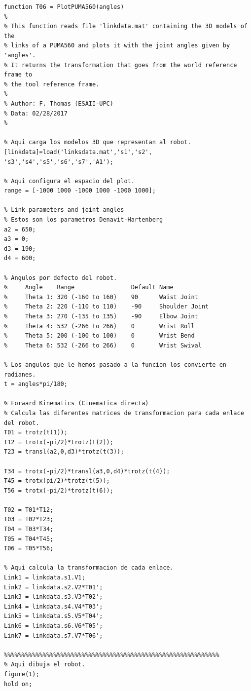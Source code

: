 \documentclass{article}
\begin{document}
\begin{lstlisting}[frame=single]
function T06 = PlotPUMA560(angles)
%
% This function reads file 'linkdata.mat' containing the 3D models of the
% links of a PUMA560 and plots it with the joint angles given by 'angles'. 
% It returns the transformation that goes from the world reference frame to
% the tool reference frame.
%
% Author: F. Thomas (ESAII-UPC)
% Data: 02/28/2017
%
 
% Aqui carga los modelos 3D que representan al robot.
[linkdata]=load('linksdata.mat','s1','s2', 's3','s4','s5','s6','s7','A1');

% Aqui configura el espacio del plot.
range = [-1000 1000 -1000 1000 -1000 1000];

% Link parameters and joint angles
% Estos son los parametros Denavit-Hartenberg
a2 = 650;
a3 = 0;
d3 = 190;
d4 = 600;

% Angulos por defecto del robot.
%     Angle    Range                Default Name
%     Theta 1: 320 (-160 to 160)    90      Waist Joint
%     Theta 2: 220 (-110 to 110)    -90     Shoulder Joint
%     Theta 3: 270 (-135 to 135)    -90     Elbow Joint
%     Theta 4: 532 (-266 to 266)    0       Wrist Roll
%     Theta 5: 200 (-100 to 100)    0       Wrist Bend
%     Theta 6: 532 (-266 to 266)    0       Wrist Swival

% Los angulos que le hemos pasado a la funcion los convierte en radianes.
t = angles*pi/180; 

% Forward Kinematics (Cinematica directa)
% Calcula las diferentes matrices de transformacion para cada enlace del robot.
T01 = trotz(t(1));
T12 = trotx(-pi/2)*trotz(t(2));
T23 = transl(a2,0,d3)*trotz(t(3));

T34 = trotx(-pi/2)*transl(a3,0,d4)*trotz(t(4));
T45 = trotx(pi/2)*trotz(t(5));
T56 = trotx(-pi/2)*trotz(t(6));

T02 = T01*T12;
T03 = T02*T23;
T04 = T03*T34;
T05 = T04*T45;
T06 = T05*T56;

% Aqui calcula la transformacion de cada enlace.
Link1 = linkdata.s1.V1;
Link2 = linkdata.s2.V2*T01';
Link3 = linkdata.s3.V3*T02';
Link4 = linkdata.s4.V4*T03';
Link5 = linkdata.s5.V5*T04';
Link6 = linkdata.s6.V6*T05';
Link7 = linkdata.s7.V7*T06';

%%%%%%%%%%%%%%%%%%%%%%%%%%%%%%%%%%%%%%%%%%%%%%%%%%%%%%%%%%%%%
% Aqui dibuja el robot.
figure(1);
hold on;


\end{lstlisting}
\end{document}
